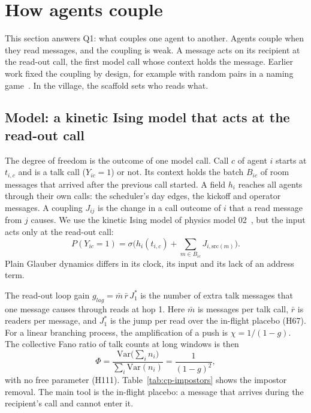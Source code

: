\section{How agents couple}
\label{sec:coupling}

This section answers Q1: what couples one agent to another. Agents couple when they read messages, and the coupling is weak. A message acts on its recipient at the read-out call, the first model call whose context holds the message. Earlier work fixed the coupling by design, for example with random pairs in a naming game~\cite{ashery2025}. In the village, the scaffold sets who reads what.

\subsection{Model: a kinetic Ising model that acts at the read-out call}
\label{sec:coupling-model}

The degree of freedom is the outcome of one model call. Call $c$ of agent $i$ starts at $t_{i,c}$ and is a talk call ($Y_{ic}=1$) or not. Its context holds the batch $B_{ic}$ of room messages that arrived after the previous call started. A field $h_i$ reaches all agents through their own calls: the scheduler's day edges, the kickoff and operator messages. A coupling $J_{ij}$ is the change in a call outcome of $i$ that a read message from $j$ causes. We use the kinetic Ising model of physics model 02~\cite{aguilera2026}, but the input acts only at the read-out call:
\begin{equation}
P(Y_{ic}=1)=\sigma\Big(h_{i}(t_{i,c})+\textstyle\sum_{m\in B_{ic}}J_{i,\mathrm{src}(m)}\Big).
\label{eq:cp-readout}
\end{equation}
Plain Glauber dynamics differs in its clock, its input and its lack of an address term.

The read-out loop gain $g_{lag}=\bar m\,\bar r\,J_1^*$ is the number of extra talk messages that one message causes through reads at hop 1. Here $\bar m$ is messages per talk call, $\bar r$ is readers per message, and $J_1^*$ is the jump per read over the in-flight placebo (H67). For a linear branching process, the amplification of a push is $\chi=1/(1-g)$. The collective Fano ratio of talk counts at long windows is then
\begin{equation}
\Phi=\frac{\mathrm{Var}\big(\sum_i n_i\big)}{\sum_i\mathrm{Var}(n_i)}=\frac{1}{(1-g)^2},
\label{eq:cp-fano}
\end{equation}
with no free parameter (H111). Table~\ref{tab:cp-impostors} shows the impostor removal. The main tool is the in-flight placebo: a message that arrives during the recipient's call and cannot enter it.


